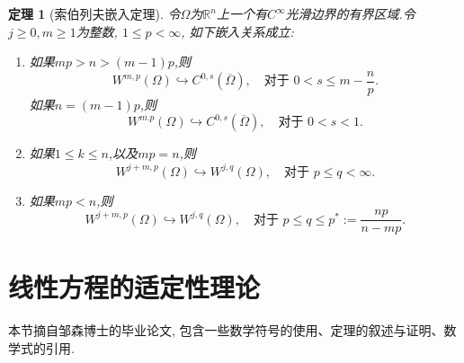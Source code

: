 \documentclass[a4paper,punct=banjiao,twoside]{ctexrep}
\theoremstyle{plain}
\newtheorem{thm}{定理}[chapter]
\theoremstyle{definition}
\theoremstyle{remark}
\begin{document}
\begin{thm}[索伯列夫嵌入定理{\cite{AF03}}]\label{thm:sobolev-embedding}
令$\Omega$为$\mathbb{R}^n$上一个有$C^{\infty}$光滑边界的有界区域.令$j\geq 0, m\geq 1$为整数, $1\leq p<\infty$, 如下嵌入关系成立:
\begin{enumerate}
\item 如果$mp>n>(m-1)p$,则
$$
W^{m,p}(\Omega) \hookrightarrow C^{0,s}(\overline{\Omega}), \quad \text{对于 }0<s\leq m-\frac{n}{p}.
$$
如果$n=(m-1)p$,则
$$
W^{m.p}(\Omega) \hookrightarrow C^{0,s}(\overline{\Omega}), \quad \text{对于 }0<s<1.
$$
\item 如果$1\leq k\leq n$,以及$mp=n$,则
$$
W^{j+m,p}(\Omega)\hookrightarrow W^{j,q}(\Omega), \quad \text{对于 }p\leq q < \infty.
$$
\item 如果$mp<n$,则
$$
W^{j+m,p}(\Omega) \hookrightarrow W^{j,q}(\Omega), \quad \text{对于 }p\leq q \leq p^{*}:=\frac{np}{n-mp}.
$$
\end{enumerate}
\end{thm}



\section{线性方程的适定性理论}\label{sec:linear-wellposedness}
本节摘自邹森博士的毕业论文, 包含一些数学符号的使用、定理的叙述与证明、数学式的引用.
\end{document}

